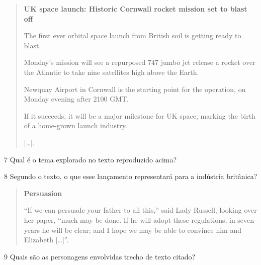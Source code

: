 \begin{quote}
\textbf{UK space launch: Historic Cornwall rocket mission set to blast off}

The first ever orbital space launch from British soil is getting ready
to blast.

Monday's mission will see a repurposed 747 jumbo jet release a rocket
over the Atlantic to take nine satellites high above the Earth.

Newquay Airport in Cornwall is the starting point for the operation, on
Monday evening after 2100 GMT.

If it succeeds, it will be a major milestone for UK space, marking the
birth of a home-grown launch industry.

{[}\ldots{}{]}.

\end{quote}

\num{7} Qual é o tema explorado no texto reproduzido acima?



\num{8} Segundo o texto, o que esse lançamento representará para a indústria britânica?




\begin{quote}
\textbf{Persuasion}

``If we can persuade your father to all this,'' said Lady Russell,
looking over her paper, ``much may be done. If he will adopt these
regulations, in seven years he will be clear; and I hope we may be able
to convince him and Elizabeth {[}\ldots{}{]}''.

\end{quote}

\num{9} Quais são as personagens envolvidas trecho de texto citado?

